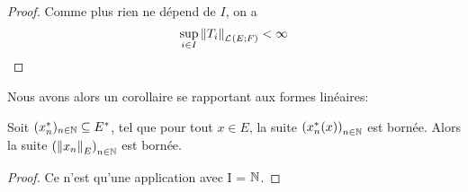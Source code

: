 \begin{proof}
	Comme plus rien ne dépend de $I$, on a
	\begin{equation}
		\sup_{i \in I} \norm{T_{i}}_{\mathcal{L}_{}(E; F)} < \infty
	\end{equation}
\end{proof}
\fi

Nous avons alors un corollaire se rapportant aux formes linéaires:

\begin{corollary}
	Soit $(x^{*}_{n})_{n \in \mathbb{N}} \subseteq E^{*}$, tel que pour
	tout $x \in E$, la suite ${(x_{n}^{*}(x))}_{n \in \mathbb{N}}$ est bornée. Alors
	la suite ${(\norm{x_{n}}_{E})}_{n \in \mathbb{N}}$ est bornée.
\end{corollary}

\ifdefined\outputproof
\begin{proof}
	Ce n'est qu'une application avec I = $\mathbb{N}$.
\end{proof}
\fi
